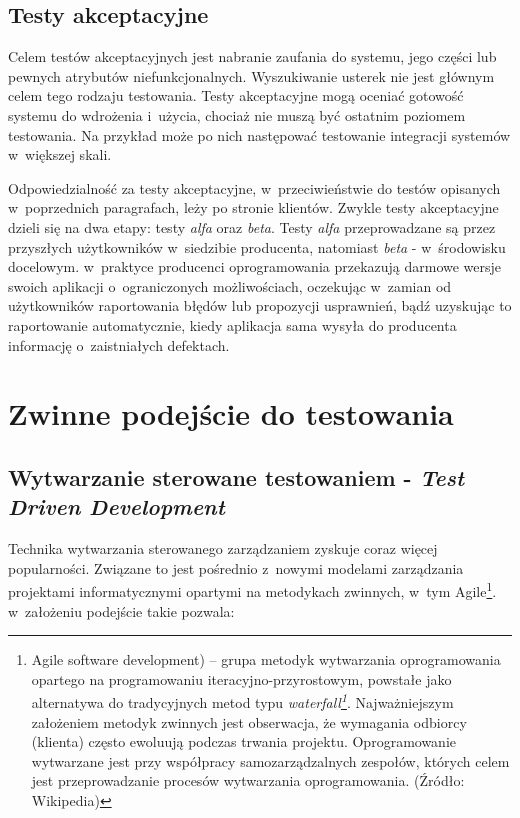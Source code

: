 \subsection{Testy akceptacyjne}

Celem testów akceptacyjnych jest nabranie zaufania do systemu, jego części lub pewnych atrybutów niefunkcjonalnych. Wyszukiwanie usterek nie jest głównym celem tego rodzaju testowania. Testy akceptacyjne mogą oceniać gotowość systemu do wdrożenia i~użycia, chociaż nie muszą być ostatnim poziomem testowania. Na przykład może po nich następować testowanie integracji systemów w~większej skali.

Odpowiedzialność za testy akceptacyjne, w~przeciwieństwie do testów opisanych w~poprzednich paragrafach, leży po stronie klientów. Zwykle testy akceptacyjne dzieli się na dwa etapy: testy \textit{alfa} oraz \textit{beta}. Testy \textit{alfa} przeprowadzane są przez przyszłych użytkowników w~siedzibie producenta, natomiast \textit{beta} - w~środowisku docelowym. w~praktyce producenci oprogramowania przekazują darmowe wersje swoich aplikacji o~ograniczonych możliwościach, oczekując w~zamian od użytkowników raportowania błędów lub propozycji usprawnień, bądź uzyskując to raportowanie automatycznie, kiedy aplikacja sama wysyła do producenta informację o~zaistniałych defektach.\cite{bib:sylabus:foundation}

\section{Zwinne podejście do testowania}
\subsection{Wytwarzanie sterowane testowaniem - \textit{Test Driven \newline Development}}
\label{test_driven_development}
Technika wytwarzania sterowanego zarządzaniem zyskuje coraz więcej popularności. Związane to jest pośrednio z~nowymi modelami zarządzania projektami informatycznymi opartymi na metodykach zwinnych, w~tym Agile\footnote{Agile software development) – grupa metodyk wytwarzania oprogramowania opartego na programowaniu iteracyjno-przyrostowym, powstałe jako alternatywa do tradycyjnych metod typu \textit{waterfall\footnote{Iteracyjny model kaskadowy (ang. waterfall model) – jeden z~kilku rodzajów procesów tworzenia oprogramowania zdefiniowany w~inżynierii oprogramowania. Polega on na wykonywaniu podstawowych czynności jako odrębnych faz projektowych, w~porządku jeden po drugim. Każda czynność to kolejny schodek (kaskada). Jeśli któraś z~faz zwróci niesatysfakcjonujący produkt, należy się cofnąć wykonując kolejne iteracje aż do momentu kiedy otrzymano satysfakcjonujący produkt na końcu schodków. Źródło: Wikipedia}}. Najważniejszym założeniem metodyk zwinnych jest obserwacja, że wymagania odbiorcy (klienta) często ewoluują podczas trwania projektu. Oprogramowanie wytwarzane jest przy współpracy samozarządzalnych zespołów, których celem jest przeprowadzanie procesów wytwarzania oprogramowania. (Źródło: Wikipedia) }. w~założeniu podejście takie pozwala:

